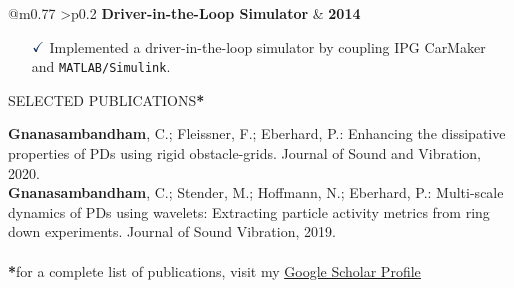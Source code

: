 \documentclass[a4paper,10pt]{article}
\begin{document}
\vspace{0.3cm}
\noindent
\begin{tabular}{ @{\hskip 0pt}m{0.77\textwidth} >{\raggedleft\arraybackslash}p{0.2\textwidth} }
    \noindent\textbf{Driver-in-the-Loop Simulator} & \textbf{2014}
\end{tabular}

{\small
\begin{itemize}
    \item[$\textcolor{highlightcolor}{\checkmark}$]  
    Implemented a driver-in-the-loop simulator by coupling IPG CarMaker and {\verb|MATLAB/Simulink|}.
\end{itemize}
}

\noindent{\rule{\linewidth}{1.4pt}}
SELECTED PUBLICATIONS\textbf{*}

\vspace{-0.1cm}
\noindent{\rule{\linewidth}{0.01cm}}

{\small 
    \noindent \textbf{Gnanasambandham}, C.; Fleissner, F.; Eberhard, P.: Enhancing the dissipative properties of PDs using rigid obstacle-grids. Journal of Sound and Vibration, 2020.\\
    \noindent \textbf{Gnanasambandham}, C.; Stender, M.; Hoffmann, N.; Eberhard, P.: Multi-scale dynamics of PDs using wavelets: Extracting particle activity metrics from ring down experiments. Journal of Sound Vibration, 2019.\\ \\
    \noindent \textbf{*}for a complete list of publications, visit my \href{https://scholar.google.com/citations?user=azp3ffYAAAAJ&hl=de}{\textcolor{highlightcolor}{\underline{Google Scholar Profile}}} 
}
\end{document}

